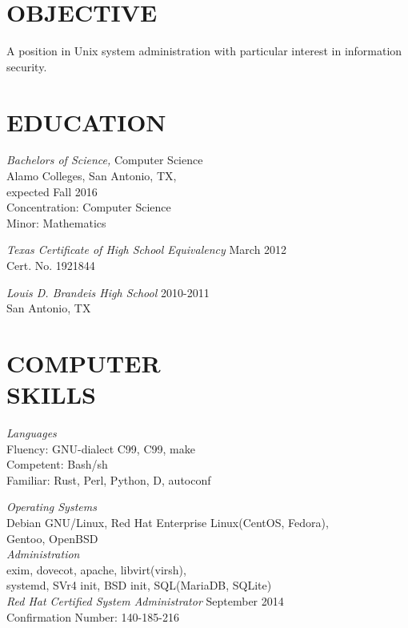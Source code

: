 \documentclass[11pt,line,margin]{res}
\begin{document}
\address{12726 Castle Bend St., San Antonio, TX 78230}
\address{(210) 980 3438 // james@theta.pw}
 
\begin{resume}
 
\section{OBJECTIVE} A position in Unix system administration with particular
		interest in information security.
 
 
\section{EDUCATION}
		{\sl Bachelors of Science,} Computer Science \\
		Alamo Colleges, San Antonio, TX, \\
		expected Fall 2016 \\
		Concentration: Computer Science \\
		Minor: Mathematics

		{\sl Texas Certificate of High School Equivalency} \hfill March 2012 \\
		Cert. No. 1921844

		{\sl Louis D. Brandeis High School} \hfill 2010-2011 \\
		San Antonio, TX
 
\section{COMPUTER \\ SKILLS}
		{\sl Languages} \\
		Fluency: GNU-dialect C99, C99, make \\
		Competent: Bash/sh \\
		Familiar: Rust, Perl, Python, D, autoconf

        {\sl Operating Systems} \\
		Debian GNU/Linux, Red Hat Enterprise Linux(CentOS, Fedora), \\
		Gentoo, OpenBSD \\

		{\sl Administration} \\
		exim, dovecot, apache, libvirt(virsh), \\
		systemd, SVr4 init, BSD init, SQL(MariaDB, SQLite) \\

		{\sl Red Hat Certified System Administrator} \hfill September 2014 \\
		Confirmation Number: 140-185-216


\end{resume}
\end{document}
